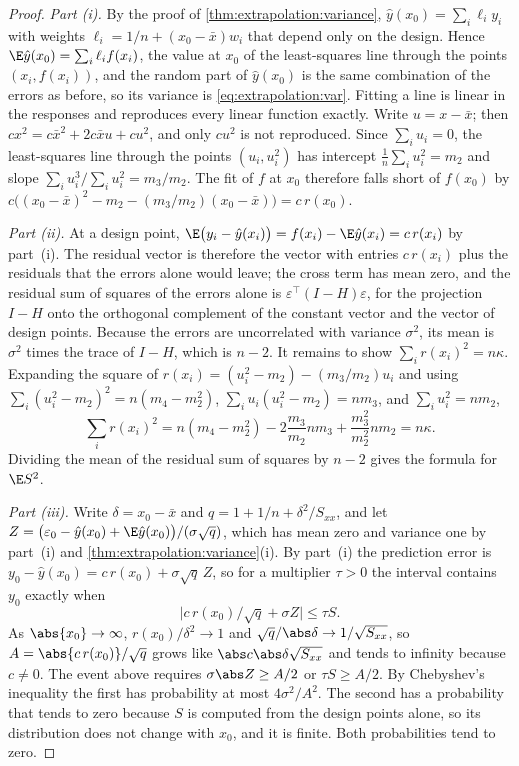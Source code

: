 \begin{refsection}
\begin{proof}
\emph{Part (i).} By the proof of \cref{thm:extrapolation:variance}, $\hat y(x_0)=\sum_i\ell_iy_i$ with weights $\ell_i=1/n+(x_0-\bar x)w_i$ that depend only on the design. Hence $\E\hat y(x_0)=\sum_i\ell_if(x_i)$, the value at $x_0$ of the least-squares line through the points $(x_i,f(x_i))$, and the random part of $\hat y(x_0)$ is the same combination of the errors as before, so its variance is \eqref{eq:extrapolation:var}. Fitting a line is linear in the responses and reproduces every linear function exactly. Write $u=x-\bar x$; then $cx^2=c\bar x^2+2c\bar xu+cu^2$, and only $cu^2$ is not reproduced. Since $\sum_iu_i=0$, the least-squares line through the points $(u_i,u_i^2)$ has intercept $\frac1n\sum_iu_i^2=m_2$ and slope $\sum_iu_i^3/\sum_iu_i^2=m_3/m_2$. The fit of $f$ at $x_0$ therefore falls short of $f(x_0)$ by $c\bigl((x_0-\bar x)^2-m_2-(m_3/m_2)(x_0-\bar x)\bigr)=c\,r(x_0)$.

\emph{Part (ii).} At a design point, $\E\bigl(y_i-\hat y(x_i)\bigr)=f(x_i)-\E\hat y(x_i)=c\,r(x_i)$ by part~(i). The residual vector is therefore the vector with entries $c\,r(x_i)$ plus the residuals that the errors alone would leave; the cross term has mean zero, and the residual sum of squares of the errors alone is $\varepsilon^\top(I-H)\varepsilon$, for the projection $I-H$ onto the orthogonal complement of the constant vector and the vector of design points. Because the errors are uncorrelated with variance $\sigma^2$, its mean is $\sigma^2$ times the trace of $I-H$, which is $n-2$. It remains to show $\sum_ir(x_i)^2=n\kappa$. Expanding the square of $r(x_i)=(u_i^2-m_2)-(m_3/m_2)u_i$ and using $\sum_i(u_i^2-m_2)^2=n(m_4-m_2^2)$, $\sum_iu_i(u_i^2-m_2)=nm_3$, and $\sum_iu_i^2=nm_2$,
\[
\sum_ir(x_i)^2=n(m_4-m_2^2)-2\frac{m_3}{m_2}nm_3+\frac{m_3^2}{m_2^2}nm_2=n\kappa .
\]
Dividing the mean of the residual sum of squares by $n-2$ gives the formula for $\E S^2$.

\emph{Part (iii).} Write $\delta=x_0-\bar x$ and $q=1+1/n+\delta^2/S_{xx}$, and let $Z=\bigl(\varepsilon_0-\hat y(x_0)+\E\hat y(x_0)\bigr)/(\sigma\sqrt q)$, which has mean zero and variance one by part~(i) and \cref{thm:extrapolation:variance}(i). By part~(i) the prediction error is $y_0-\hat y(x_0)=c\,r(x_0)+\sigma\sqrt q\,Z$, so for a multiplier $\tau>0$ the interval contains $y_0$ exactly when
\[
\bigl|c\,r(x_0)/\sqrt q+\sigma Z\bigr|\le\tau S .
\]
As $\abs{x_0}\to\infty$, $r(x_0)/\delta^2\to1$ and $\sqrt q/\abs\delta\to1/\sqrt{S_{xx}}$, so $A=\abs{c\,r(x_0)}/\sqrt q$ grows like $\abs c\abs\delta\sqrt{S_{xx}}$ and tends to infinity because $c\ne0$. The event above requires $\sigma\abs Z\ge A/2$ or $\tau S\ge A/2$. By Chebyshev's inequality the first has probability at most $4\sigma^2/A^2$. The second has a probability that tends to zero because $S$ is computed from the design points alone, so its distribution does not change with $x_0$, and it is finite. Both probabilities tend to zero.
\end{proof}


\end{refsection}
